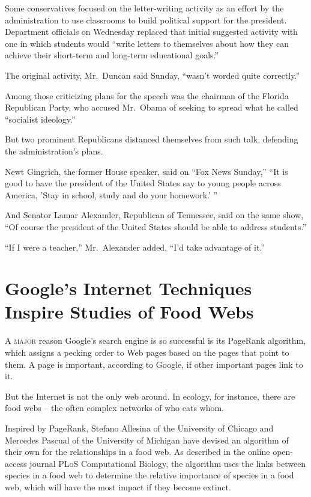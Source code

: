 ﻿\documentclass[12pt]{article}
\begin{document}
Some conservatives focused on the letter-writing activity as an effort by the administration to use
classrooms to build political support for the president. Department officials on Wednesday replaced
that initial suggested activity with one in which students would ``write letters to themselves about
how they can achieve their short-term and long-term educational goals.''

The original activity, Mr.~Duncan said Sunday, ``wasn't worded quite correctly.''

Among those criticizing plans for the speech was the chairman of the Florida Republican Party, who
accused Mr.~Obama of seeking to spread what he called ``socialist ideology.''

But two prominent Republicans distanced themselves from such talk, defending the administration's
plans.

Newt Gingrich, the former House speaker, said on ``Fox News Sunday,'' ``It is good to have the
president of the United States say to young people across America, 'Stay in school, study and do
your homework.' ''

And Senator Lamar Alexander, Republican of Tennessee, said on the same show, ``Of course the
president of the United States should be able to address students.''

``If I were a teacher,'' Mr.~Alexander added, ``I'd take advantage of it.''

\section{Google's Internet Techniques Inspire Studies of Food Webs}

\lettrine{A}{ major} reason Google's search engine is so successful is its PageRank algorithm, which
assigns a pecking order to Web pages based on the pages that point to them. A page is important,
according to Google, if other important pages link to it.

But the Internet is not the only web around. In ecology, for instance, there are food webs -- the
often complex networks of who eats whom.

Inspired by PageRank, Stefano Allesina of the University of Chicago and Mercedes Pascual of the
University of Michigan have devised an algorithm of their own for the relationships in a food web.
As described in the online open-access journal PLoS Computational Biology, the algorithm uses the
links between species in a food web to determine the relative importance of species in a food web,
which will have the most impact if they become extinct.
\end{document}
